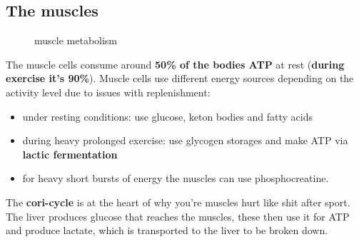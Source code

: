 \documentclass[../main.tex]{subfiles}
\begin{document}
\subsection{The muscles}
\begin{figure}[H]
	\centering
	\caption{muscle metabolism}
\end{figure}
The muscle cells consume around\textbf{ 50\% of the bodies ATP} at rest (\textbf{during exercise it's 90\%}). Muscle cells use different energy sources depending on the activity level due to issues with replenishment:
\begin{itemize}
    \item under resting conditions: use glucose, keton bodies and fatty acids
    \item during heavy prolonged exercise: use glycogen storages and make ATP via \textbf{lactic fermentation}
    \item for heavy short bursts of energy the muscles can use phosphocreatine.
\end{itemize}
The \textbf{\gls{cori-cycle}} is at the heart of why you're muscles hurt like shit after sport. The liver produces glucose that reaches the muscles, these then use it for ATP and produce lactate, which is transported to the liver to be broken down.
\end{document}
